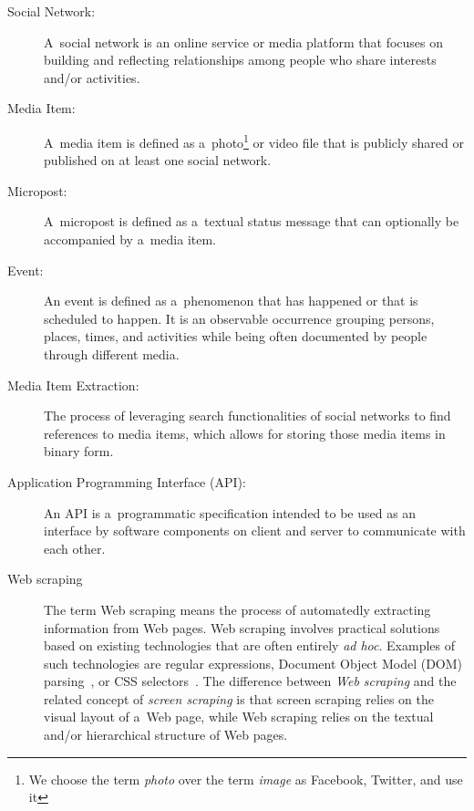 \begin{description}
  \item[Social Network:]
       A~social network is an online service or media platform
       that focuses on building and reflecting
       relationships among people
       who share interests and/or activities.
  \item[Media Item:]
       A~media item is defined as
       a~photo\footnote{We choose the term \emph{photo}
       over the term \emph{image} as 
       Facebook, Twitter, and \googleplus use it}
       or video file that is publicly shared or published
       on at least one social network.
  \item[Micropost:]
       A~micropost is defined as a~textual status message
       that can optionally be accompanied by a~media item.
  \item[Event:]
       An event is defined as a~phenomenon that has happened
       or that is scheduled to happen.
       It is an observable occurrence grouping persons,
       places, times, and activities while being often
       documented by people through different media.
  \item[Media Item Extraction:]
       The process of leveraging search functionalities of
       social networks to find references to media items,
       which allows for storing those media items in binary form.       
  \item[Application Programming Interface (API):]
       An API is a~programmatic specification intended to be used
       as an interface by software components on client and server
       to communicate with each other.
  \item[Web scraping]
       The term Web scraping means the process of
       automatedly extracting information from Web pages.
       Web scraping involves practical solutions based on
       existing technologies that are often entirely \emph{ad hoc}.
       Examples of such technologies are regular expressions,
       Document Object Model (DOM)
       parsing~\cite{lehors2004dom},
       or CSS selectors~\cite{hunt2012cssselectors}.
       The difference between \emph{Web scraping}
       and the related concept of \emph{screen scraping}
       is that screen scraping relies on the visual layout of a~Web page,
       while Web scraping relies on the textual
       and/or hierarchical structure of Web pages.
\end{description}

